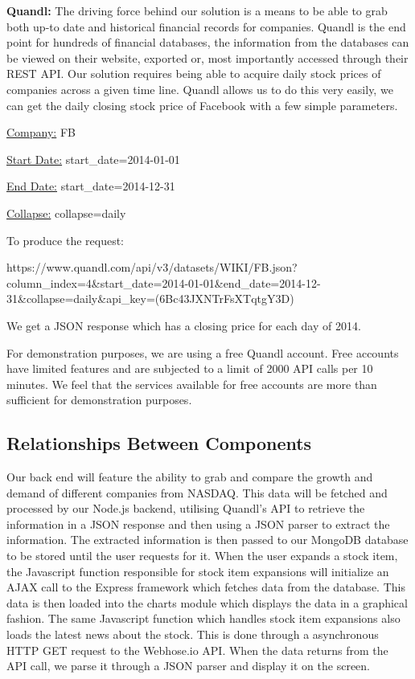 \documentclass[11pt]{article}
\numberwithin{figure}{section}
\begin{document}
        
        \bigskip
        \noindent
        {\bfseries Quandl:} The driving force behind our solution is a means to be able to grab both up-to date and historical financial records for companies. Quandl is the end point for hundreds of financial databases, the information from the databases can be viewed on their website, exported or, most importantly accessed through their REST API. Our solution requires being able to acquire daily stock prices of companies across a given time line. Quandl allows us to do this very easily, we can get the daily closing stock price of Facebook with a few simple parameters.

        \bigskip
        \noindent
        \underline{Company:} FB
    
        \noindent
        \underline{Start Date:} start\_date=2014-01-01
    
        \noindent
        \underline{End Date:} start\_date=2014-12-31
    
        \noindent
        \underline{Collapse:} collapse=daily
    
        \bigskip
        \noindent
        To produce the request:
    
        \noindent
        https://www.quandl.com/api/v3/datasets/WIKI/FB.json?column\_index=4\&start\_date=2014-01-01\&end\_date=2014-12-31\&collapse=daily\&api\_key=(6Bc43JXNTrFsXTqtgY3D)

        \bigskip
        \noindent
        We get a JSON response which has a closing price for each day of 2014.

        \bigskip
        \noindent
        For demonstration purposes, we are using a free Quandl account. Free accounts have limited features and are subjected to a limit of 2000 API calls per 10 minutes. We feel that the services available for free accounts are more than sufficient for demonstration purposes.

    \subsection{Relationships Between Components}
        Our back end will feature the ability to grab and compare the growth and demand of different companies from NASDAQ. This data will be fetched and processed by our Node.js backend, utilising Quandl’s API to retrieve the information in a JSON response and then using a JSON parser to extract the information. The extracted information is then passed to our MongoDB database to be stored until the user requests for it. When the user expands a stock item, the Javascript function responsible for stock item expansions will initialize an AJAX call to the Express framework which fetches data from the database. This data is then loaded into the charts module which displays the data in a graphical fashion. The same Javascript function which handles stock item expansions also loads the latest news about the stock. This is done through a asynchronous HTTP GET request to the Webhose.io API. When the data returns from the API call, we parse it through a JSON parser and display it on the screen.
        
\end{document}
